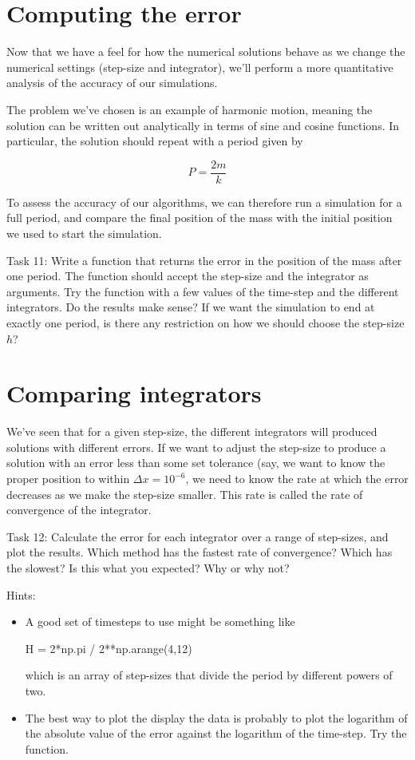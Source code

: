 \documentclass[main.tex]{subfiles}
\begin{document}
\section{Computing the error}

Now that we have a feel for how the numerical solutions behave as we change the numerical settings (step-size and integrator), we'll perform a more quantitative analysis of the accuracy of our simulations.

The problem we've chosen is an example of harmonic motion, meaning the solution can be written out analytically in terms of sine and cosine functions.
In particular, the solution should repeat with a period given by

\begin{equation}
    P = \frac{2 m}{k}
\end{equation}

To assess the accuracy of our algorithms, we can therefore run a simulation for a full period, and compare the final position of the mass with the initial position we used to start the simulation.

Task 11:
Write a function that returns the error in the position of the mass after one period.
The function should accept the step-size and the integrator as arguments.
Try the function with a few values of the time-step and the different integrators.
Do the results make sense?
If we want the simulation to end at exactly one period, is there any restriction on how we should choose the step-size $h$?

\section{Comparing integrators}

We've seen that for a given step-size, the different integrators will produced solutions with different errors.
If we want to adjust the step-size to produce a solution with an error less than some set tolerance (say, we want to know the proper position to within $\Delta x = 10^{-6}$, we need to know the rate at which the error decreases as we make the step-size smaller.
This rate is called the rate of convergence of the integrator.

Task 12:
Calculate the error for each integrator over a range of step-sizes, and plot the results.
Which method has the fastest rate of convergence?
Which has the slowest?
Is this what you expected?
Why or why not?

Hints:
\begin{itemize}
\item A good set of timesteps to use might be something like
\begin{python}
 H = 2*np.pi / 2**np.arange(4,12)
\end{python}
which is an array of step-sizes that divide the period by different powers of two.
\item The best way to plot the display the data is probably to plot the logarithm of the absolute value of the error against the logarithm of the time-step.
Try the  function.
\end{itemize}
\end{document}
